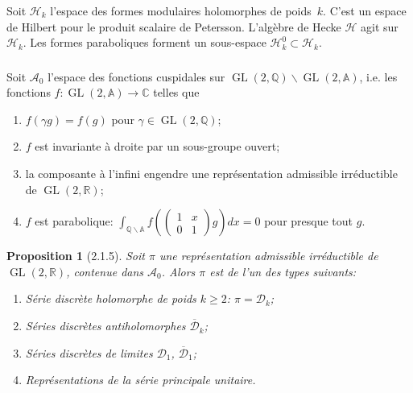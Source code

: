 \documentclass[11pt,a4paper]{amsart}
\theoremstyle{plain}
\newtheorem{proposition}[theorem]{Proposition}
\theoremstyle{definition}
\theoremstyle{remark}
\DeclareMathOperator{\GL}{GL}
\newcommand{\QQ}{\mathbb{Q}}
\newcommand{\RR}{\mathbb{R}}
\newcommand{\CC}{\mathbb{C}}
\newcommand{\Af}{\mathbb{A}}
\newcommand{\cH}{\mathcal{H}}
\newcommand{\cD}{\mathcal{D}}
\newcommand{\cA}{\mathcal{A}}
\newcommand{\bs}{\backslash}
\begin{document}
Soit $\cH_k$ l'espace des formes modulaires holomorphes de poids~$k$. C'est un espace de Hilbert pour le produit scalaire de Petersson. L'alg\`ebre de Hecke $\cH$ agit sur $\cH_k$. Les formes paraboliques forment un sous-espace $\cH_k^0 \subset \cH_k$.

\subsubsection{}
\label{sec:2.1.4}

Soit $\cA_0$ l'espace des fonctions cuspidales sur $\GL(2,\QQ)\bs\GL(2,\Af)$, i.e. les fonctions $f: \GL(2,\Af) \to \CC$ telles que
\begin{enumerate}
\item[(i)] $f(\gamma g) = f(g)$ pour $\gamma \in \GL(2,\QQ)$;
\item[(ii)] $f$ est invariante \`a droite par un sous-groupe ouvert;
\item[(iii)] la composante \`a l'infini engendre une repr\'esentation admissible irr\'eductible de $\GL(2,\RR)$;
\item[(iv)] $f$ est parabolique: $\int_{\QQ\bs\Af} f\left(\begin{pmatrix} 1 & x \\ 0 & 1 \end{pmatrix} g\right) dx = 0$ pour presque tout $g$.
\end{enumerate}

\begin{proposition}[2.1.5] \label{prop:2.1.5}
Soit $\pi$ une repr\'esentation admissible irr\'eductible de $\GL(2,\RR)$, contenue dans $\cA_0$. Alors $\pi$ est de l'un des types suivants:
\begin{enumerate}
\item[(a)] S\'erie discr\`ete holomorphe de poids $k \geq 2$: $\pi = \cD_k$;
\item[(b)] S\'eries discr\`etes antiholomorphes $\overline{\cD}_k$;
\item[(c)] S\'eries discr\`etes de limites $\cD_1$, $\overline{\cD}_1$;
\item[(d)] Repr\'esentations de la s\'erie principale unitaire.
\end{enumerate}
\end{proposition}

\subsubsection{}
\label{sec:2.1.6}
\end{document}
